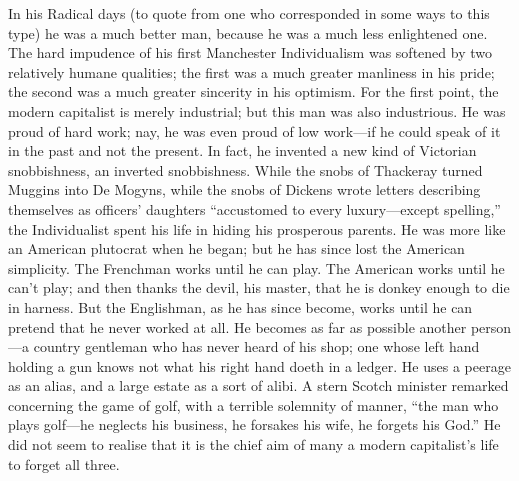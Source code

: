 \documentclass{book}
\begin{document}
In his Radical days (to quote from one who corresponded in some ways to this type) he was a much better man, because he was a much less enlightened one. The hard impudence of his first Manchester Individualism was softened by two relatively humane qualities; the first was a much greater manliness in his pride; the second was a much greater sincerity in his optimism. For the first point, the modern capitalist is merely industrial; but this man was also industrious. He was proud of hard work; nay, he was even proud of low work—if he could speak of it in the past and not the present. In fact, he invented a new kind of Victorian snobbishness, an inverted snobbishness. While the snobs of Thackeray turned Muggins into De Mogyns, while the snobs of Dickens wrote letters describing themselves as officers’ daughters “accustomed to every luxury—except spelling,” the Individualist spent his life in hiding his prosperous parents. He was more like an American plutocrat when he began; but he has since lost the American simplicity. The Frenchman works until he can play. The American works until he can’t play; and then thanks the devil, his master, that he is donkey enough to die in harness. But the Englishman, as he has since become, works until he can pretend that he never worked at all. He becomes as far as possible another person—a country gentleman who has never heard of his shop; one whose left hand holding a gun knows not what his right hand doeth in a ledger. He uses a peerage as an alias, and a large estate as a sort of alibi. A stern Scotch minister remarked concerning the game of golf, with a terrible solemnity of manner, “the man who plays golf—he neglects his business, he forsakes his wife, he forgets his God.” He did not seem to realise that it is the chief aim of many a modern capitalist’s life to forget all three.
\end{document}
